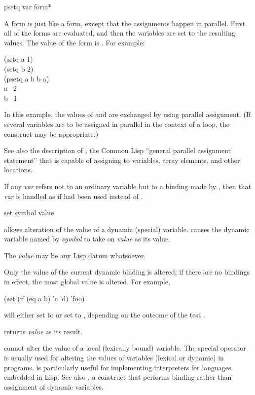 \begin{defmac}
psetq {var form}*

A  form is just like a  form, except
that the assignments happen in parallel.  First all of the forms
are evaluated, and then the variables are set to the resulting
values.  The value of the  form is {\false}.
For example:
\begin{lisp}
(setq a 1) \\
(setq b 2) \\
(psetq a b  b a) \\
a \EV\ 2 \\
b \EV\ 1
\end{lisp}
In this example, the values of  and  are exchanged by
using parallel assignment.
(If several variables are to be assigned in parallel in
the context of a loop, the  construct may be appropriate.)

See also the description of ,
the Common Lisp ``general parallel assignment statement'' that
is capable of assigning
to variables, array elements, and other locations.

If any \emph{var}
refers not to an ordinary variable but to a binding made by
, then that \emph{var} is handled as
if  had been used instead of .
\end{defmac}

\begin{defun}[Function]
set symbol value

 allows alteration of the value of a dynamic (special) variable.
 causes the dynamic variable named by \emph{symbol} to take on
\emph{value} as its value.

The \emph{value}
may be any Lisp datum whatsoever.

Only the value of the current dynamic binding is altered;
if there are no bindings in effect, the most global value is altered.
For example,
\begin{lisp}
(set (if (eq a b) 'c 'd) 'foo)
\end{lisp}
will either set  to  or set  to , depending
on the outcome of the test .

 returns \emph{value} as its result.

 cannot alter
the value of a local (lexically bound) variable.
The special operator 
is usually used for altering the values of variables
(lexical or dynamic) in programs.
 is particularly useful for implementing interpreters for
languages embedded in Lisp.
See also , a construct that performs binding rather
than assignment of dynamic variables.
\end{defun}

